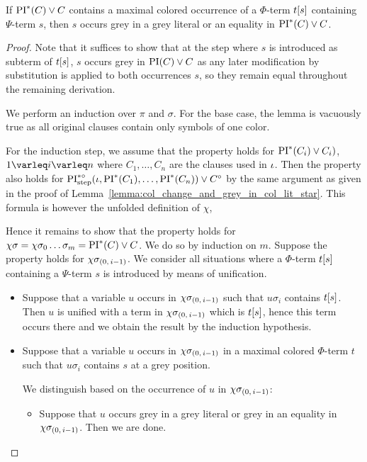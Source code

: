 \documentclass[,%
	draft=false,%
	numbers=noendperiod
	12pt,
	a4paper,
	oneside,%
	openany,
]{memoir}
\newcommand{\inv}{\ensuremath{\chi}}
\begin{document}
\begin{lemma}
	\label{lemma:subterm_in_grey_lit}
	If $\operatorname{PI}^*(C) \lor C$ contains a maximal colored occurrence of a $\Phi$-term $t[s]$ containing $\Psi$-term $s$, then 
	$s$ occurs grey in a grey literal or an equality in $\operatorname{PI}^*(C) \lor C$.
\end{lemma}
\begin{proof}
	Note that it suffices to show that at the step where $s$ is introduced as subterm of $t[s]$, $s$ occurs grey in $\operatorname{PI}(C) \lor C$ as any later modification by substitution is applied to both occurrences $s$, so they remain equal throughout the remaining derivation.

	We perform an induction over $\pi$ and $\sigma$. 
	For the base case, the lemma is vacuously true as all original clauses contain only symbols of one color.


	For the induction step,
	we assume that the property holds for $\operatorname{PI}^*(C_i) \lor C_i)$, $1\varleq i \varleq n$ where $C_1, \dots, C_n$ are the clauses used in $\iota$. Then the property also holds for $\operatorname{PI}^{*\circ}_{\mathrm{step}}(\iota, \operatorname{PI}^*(C_1), \dots, \operatorname{PI}^*(C_n)) \lor C^\circ$ by the same argument as given in the proof of Lemma~\ref{lemma:col_change_and_grey_in_col_lit_star}.
This formula is however the unfolded definition of $\inv$,

Hence it remains to show that the property holds for $\inv\sigma = \inv \sigma_0 \quantifierdots \sigma_m = \PI^*(C)\lor C$.
We do so by induction on $m$. 
Suppose the property holds for $\inv\sigmazmi$.
We consider all situations where a $\Phi$-term $t[s]$ containing a  $\Psi$-term $s$ is introduced by means of unification. 

\begin{itemize}
	\item Suppose that a variable $u$ occurs in $\inv\sigmazmi$ such that $u\sigma_i$ contains $t[s]$.
		Then $u$ is unified with a term in $\inv\sigmazmi$ which is $t[s]$, hence this term occurs there and we obtain the result by the induction hypothesis.

	\item Suppose that a variable $u$ occurs in $\inv\sigmazmi$ in a maximal colored $\Phi$-term $t$ such that $u\sigma_i$ contains $s$ at a grey position.

		We distinguish based on the occurrence of $u$ in $\inv\sigmazmi$:

		\begin{itemize}
			\item Suppose that $u$ occurs grey in a grey literal or grey in an equality in $\inv\sigmazmi$. 
				Then we are done.


\end{itemize}
\end{itemize}
\end{proof}
\end{document}
